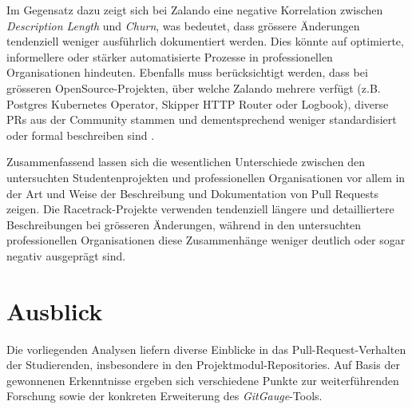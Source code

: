 Im Gegensatz dazu zeigt sich bei Zalando eine negative Korrelation zwischen \textit{Description Length} und \textit{Churn}, was bedeutet, dass grössere Änderungen tendenziell weniger ausführlich dokumentiert werden. Dies könnte auf optimierte, informellere oder stärker automatisierte Prozesse in professionellen Organisationen hindeuten. Ebenfalls muss berücksichtigt werden, dass bei grösseren OpenSource-Projekten, über welche Zalando mehrere verfügt (z.B. Postgres Kubernetes Operator, Skipper HTTP Router oder Logbook), diverse PRs aus der Community stammen und dementsprechend weniger standardisiert oder formal beschreiben sind \parencite{noauthor_zalandologbook_2025} \parencite{noauthor_zalandoskipper_2025} \parencite{noauthor_zalandopostgres-operator_2025}.

Zusammenfassend lassen sich die wesentlichen Unterschiede zwischen den untersuchten Studentenprojekten und professionellen Organisationen vor allem in der Art und Weise der Beschreibung und Dokumentation von Pull Requests zeigen. Die Racetrack-Projekte verwenden tendenziell längere und detailliertere Beschreibungen bei grösseren Änderungen, während in den untersuchten professionellen Organisationen diese Zusammenhänge weniger deutlich oder sogar negativ ausgeprägt sind.


\pagebreak
\section{Ausblick}
Die vorliegenden Analysen liefern diverse Einblicke in das Pull-Request-Verhalten der Studierenden, insbesondere in den Projektmodul-Repositories. 
Auf Basis der gewonnenen Erkenntnisse ergeben sich verschiedene Punkte zur weiterführenden Forschung sowie der konkreten Erweiterung des \textit{GitGauge}-Tools. 

